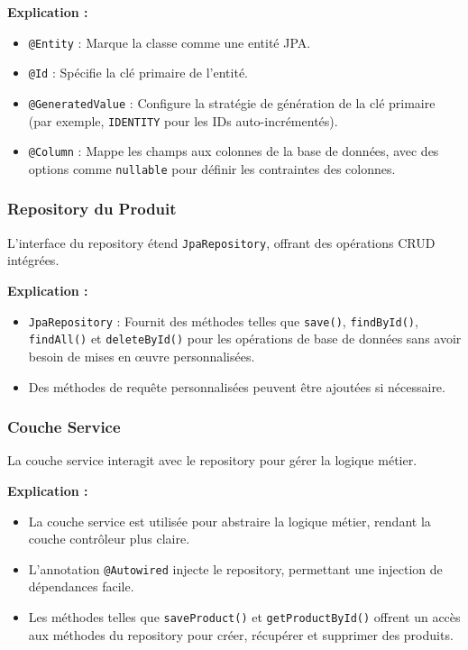 \documentclass{article}
\begin{document}
\textbf{Explication :}
\begin{itemize}
    \item \texttt{@Entity} : Marque la classe comme une entité JPA.
    \item \texttt{@Id} : Spécifie la clé primaire de l'entité.
    \item \texttt{@GeneratedValue} : Configure la stratégie de génération de la clé primaire (par exemple, \texttt{IDENTITY} pour les IDs auto-incrémentés).
    \item \texttt{@Column} : Mappe les champs aux colonnes de la base de données, avec des options comme \texttt{nullable} pour définir les contraintes des colonnes.
\end{itemize}

\subsubsection{Repository du Produit}

L'interface du repository étend \texttt{JpaRepository}, offrant des opérations CRUD intégrées.

\textbf{Explication :}
\begin{itemize}
    \item \texttt{JpaRepository} : Fournit des méthodes telles que \texttt{save()}, \texttt{findById()}, \texttt{findAll()} et \texttt{deleteById()} pour les opérations de base de données sans avoir besoin de mises en œuvre personnalisées.
    \item Des méthodes de requête personnalisées peuvent être ajoutées si nécessaire.
\end{itemize}

\subsubsection{Couche Service}

La couche service interagit avec le repository pour gérer la logique métier.

\textbf{Explication :}
\begin{itemize}
    \item La couche service est utilisée pour abstraire la logique métier, rendant la couche contrôleur plus claire.
    \item L'annotation \texttt{@Autowired} injecte le repository, permettant une injection de dépendances facile.
    \item Les méthodes telles que \texttt{saveProduct()} et \texttt{getProductById()} offrent un accès aux méthodes du repository pour créer, récupérer et supprimer des produits.
\end{itemize}
\end{document}
